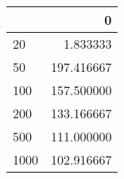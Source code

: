 \begin{tabular}{lr}
\toprule
{} &           0 \\
\midrule
20   &    1.833333 \\
50   &  197.416667 \\
100  &  157.500000 \\
200  &  133.166667 \\
500  &  111.000000 \\
1000 &  102.916667 \\
\bottomrule
\end{tabular}
